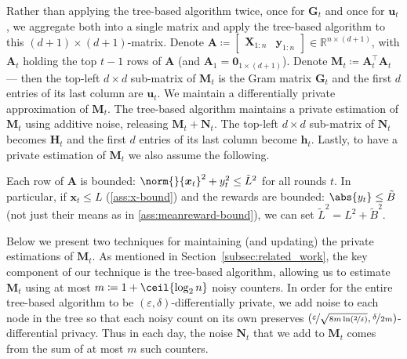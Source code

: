 \documentclass{article}
\renewcommand{\vec}[1]{\bm{#1}}
\newcommand{\defeq}{\coloneq}
\newcommand{\Real}{\mathds{R}}
\DeclarePairedDelimiter{\abs}||
\DeclarePairedDelimiter{\ceil}\lceil\rceil
\providecommand\transp{\top}
\let\transpsymbol\transp
\renewcommand{\transp}[1]{#1^\transpsymbol}
\newcommand{\XtX}[1]{\transp{#1}{#1}}
\begin{document}
Rather than applying the tree-based algorithm twice, once for $\vec G_t$ and once for $\vec u_t$, we aggregate both into a single matrix and apply the tree-based algorithm to this $(d+1)\times(d+1)$-matrix. Denote $\vec A \defeq \begin{bmatrix} \vec X_{1:n} & \vec y_{1:n} \end{bmatrix} \in
\Real^{n\times(d+1)}$, with $\vec A_t$ holding the top $t-1$ rows of $\vec A$
(and $\vec A_1 = \vec 0_{1\times(d+1)}$).  Denote $\vec M_t \defeq \XtX{\vec A_t}$
--- then the top-left $d\times d$ sub-matrix of $\vec M_t$ is the Gram
matrix $\vec G_t$ and the first $d$ entries of its last column are
$\vec u_t$. We maintain a differentially
private approximation of $\vec M_t$. The tree-based algorithm maintains a private estimation of $\vec M_t$ using additive noise, releasing $\vec M_t + \vec N_t$.  The
top-left $d\times d$ sub-matrix of $\vec N_t$ becomes $\vec H_t$ and the first
$d$ entries of its last column become $\vec h_t$. Lastly, to have a private estimation of $\vec M_t$ we also assume the following.
\begin{assumption}\label{ass:bounded-data}
  Each row of $\vec A$ is bounded:
  $\norm{}{\vec x_t}^2 + y_t^2 \le \tilde L^2$ for all rounds $t$.  In
  particular, if $\vec x_t \le L$ (\cref{ass:x-bound}) and
  the rewards are bounded: $\abs{y_t} \le \tilde B$ (not just their
  means as in \cref{ass:meanreward-bound}), we can set $\tilde L^2 = L^2 + \tilde B^2$.
\end{assumption}
Below we present two techniques for maintaining (and updating) the
private estimations of $\vec M_t$. As mentioned in
Section~\ref{subsec:related_work}, the key component of our technique is
the tree-based algorithm, allowing us to estimate $\vec M_t$ using at most
$m \defeq 1 + \ceil{\log_2n}$ noisy counters. In order for the entire
tree-based algorithm to be $(\varepsilon,\delta)$-differentially
private, we add noise to each node in the tree so that each noisy
count on its own preserves
$(\nicefrac{\varepsilon}{\sqrt{8m\ln(\nicefrac{2}{\delta})}},
\nicefrac{\delta}{2m})$-differential privacy. Thus in each day, the
noise $\vec N_t$ that we add to $\vec M_t$ comes from the sum of at most $m$
such counters.


\end{document}
